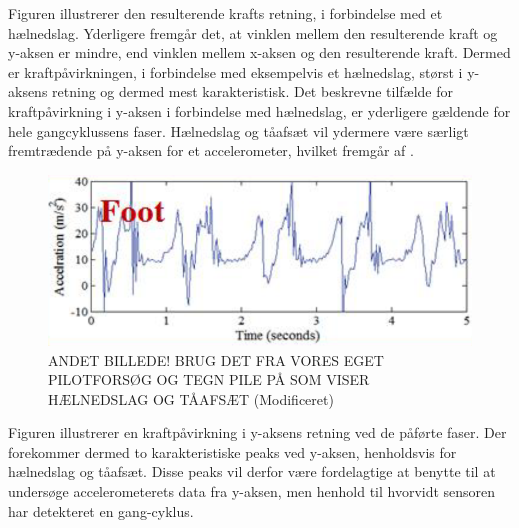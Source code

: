 Figuren illustrerer den resulterende krafts retning, i forbindelse med et hælnedslag. Yderligere fremgår det, at vinklen mellem den resulterende kraft og y-aksen er mindre, end vinklen mellem x-aksen og den resulterende kraft. Dermed er kraftpåvirkningen, i forbindelse med eksempelvis et hælnedslag, størst i y-aksens retning og dermed mest karakteristisk. \newline
Det beskrevne tilfælde for kraftpåvirkning i y-aksen i forbindelse med hælnedslag, er yderligere gældende for hele gangcyklussens faser. \citep{Rueterbories2010,Serway2010,ClelandKikhia2013} \newline
Hælnedslag og tåafsæt vil ydermere være særligt fremtrædende på y-aksen for et accelerometer, hvilket fremgår af . 

\begin{figure}[H]
	\centering
	\includegraphics[scale=0.7]{figures/bProblemloesning/gang_y_acc.png}
	\caption{ANDET BILLEDE! BRUG DET FRA VORES EGET PILOTFORSØG OG TEGN PILE PÅ SOM VISER HÆLNEDSLAG OG TÅAFSÆT \citep{ClelandKikhia2013} (Modificeret)}
	\label{fig:gang_y_acc}
\end{figure}

Figuren illustrerer en kraftpåvirkning i y-aksens retning ved de påførte faser. Der forekommer dermed to karakteristiske peaks ved y-aksen, henholdsvis for hælnedslag og tåafsæt. Disse peaks vil derfor være fordelagtige at benytte til at undersøge accelerometerets data fra y-aksen, men henhold til hvorvidt sensoren har detekteret en gang-cyklus. 

